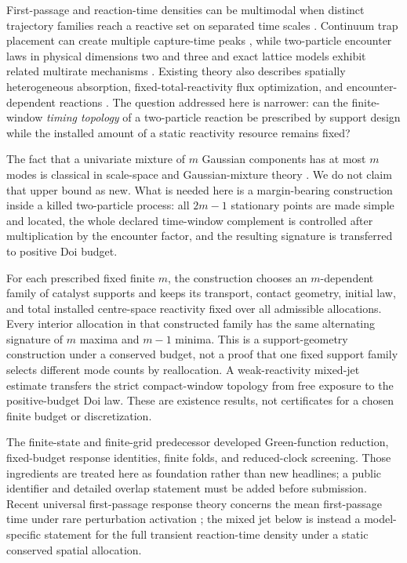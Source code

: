 \documentclass[aps,physrev,reprint,amsmath,amssymb,longbibliography,floatfix]{revtex4-2}
\begin{document}
First-passage and reaction-time densities can be multimodal when distinct
trajectory families reach a reactive set on separated time scales
\cite{godecMetzler2017twochannel,grebenkovMetzlerOshanin2018defocusing}.
Continuum trap placement can create multiple capture-time peaks
\cite{lindsaySpoonmoreTzou2016narrow}, while two-particle encounter laws in
physical dimensions two and three and exact lattice models exhibit related
multirate mechanisms
\cite{leVotEtAl2022encounter,giuggioli2020confined,
giuggioliEtAl2024multitarget}.  Existing theory also
describes spatially heterogeneous absorption, fixed-total-reactivity flux
optimization, and encounter-dependent reactions
\cite{nguyenGrebenkov2010porous,grebenkov2019heterogeneous,
nicolaouMulder2023flux,grebenkov2020paradigm}.  The question addressed here is
narrower: can the finite-window \emph{timing topology} of a two-particle
reaction be prescribed by support design while the installed amount of a
static reactivity resource remains fixed?

The fact that a univariate mixture of $m$ Gaussian components has at most
$m$ modes is classical in scale-space and Gaussian-mixture theory
\cite{carreiraPerpinanWilliams2003modes,amendolaEngstromHaase2020modes}.
We do not claim that upper bound as new.  What is needed here is a
margin-bearing construction inside a killed two-particle process: all
$2m-1$ stationary points are made simple and located, the whole declared
time-window complement is controlled after multiplication by the encounter
factor, and the resulting signature is transferred to positive Doi budget.

For each prescribed fixed finite $m$, the construction chooses an
$m$-dependent family of catalyst supports and keeps its transport, contact
geometry, initial law, and total installed centre-space reactivity fixed over
all admissible allocations.  Every interior allocation in that constructed
family has the same alternating signature of $m$ maxima and $m-1$ minima.  This
is a support-geometry construction under a conserved budget, not a proof that
one fixed support family selects different mode counts by reallocation.  A
weak-reactivity mixed-jet estimate transfers the strict compact-window topology
from free exposure to the positive-budget Doi law.  These are existence
results, not certificates for a chosen finite budget or discretization.

The finite-state and finite-grid predecessor developed Green-function
reduction, fixed-budget response identities, finite folds, and reduced-clock
screening.  Those ingredients are treated here as foundation rather than new
headlines; a public identifier and detailed overlap statement must be added
before submission.  Recent universal first-passage response theory concerns
the mean first-passage time under rare perturbation activation
\cite{keidarReuveni2026linear}; the mixed jet below is instead a
model-specific statement for the full transient reaction-time density under a
static conserved spatial allocation.
\end{document}
